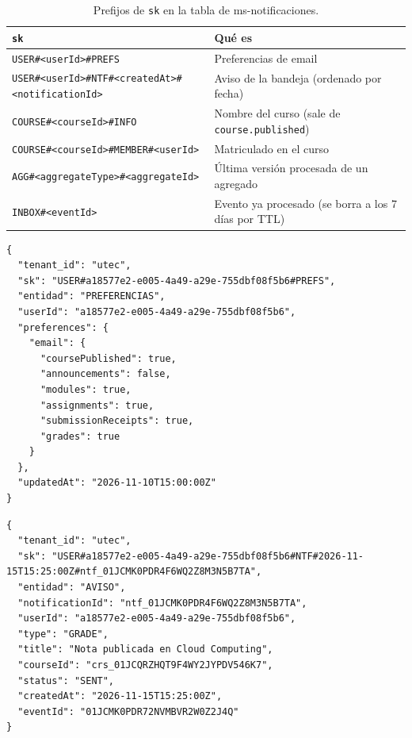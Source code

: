 \begin{table}[htbp]
\centering\small
\begin{tabularx}{\textwidth}{>{\raggedright\arraybackslash}p{}X}
\toprule
\texttt{sk} & Qué es \\
\midrule
\texttt{USER\#\allowbreak{}<userId>\#\allowbreak{}PREFS} & Preferencias de email \\
\texttt{USER\#\allowbreak{}<userId>\#\allowbreak{}NTF\#\allowbreak{}<createdAt>\#\allowbreak{}<notificationId>} & Aviso de la bandeja (ordenado por fecha) \\
\texttt{COURSE\#\allowbreak{}<courseId>\#\allowbreak{}INFO} & Nombre del curso (sale de \texttt{course.published}) \\
\texttt{COURSE\#\allowbreak{}<courseId>\#\allowbreak{}MEMBER\#\allowbreak{}<userId>} & Matriculado en el curso \\
\texttt{AGG\#\allowbreak{}<aggregateType>\#\allowbreak{}<aggregateId>} & Última versión procesada de un agregado \\
\texttt{INBOX\#\allowbreak{}<eventId>} & Evento ya procesado (se borra a los 7 días por TTL) \\
\bottomrule
\end{tabularx}
\caption{Prefijos de \texttt{sk} en la tabla de ms-notificaciones.}
\end{table}

\begin{lstlisting}
{
  "tenant_id": "utec",
  "sk": "USER#a18577e2-e005-4a49-a29e-755dbf08f5b6#PREFS",
  "entidad": "PREFERENCIAS",
  "userId": "a18577e2-e005-4a49-a29e-755dbf08f5b6",
  "preferences": {
    "email": {
      "coursePublished": true,
      "announcements": false,
      "modules": true,
      "assignments": true,
      "submissionReceipts": true,
      "grades": true
    }
  },
  "updatedAt": "2026-11-10T15:00:00Z"
}
\end{lstlisting}

\begin{lstlisting}
{
  "tenant_id": "utec",
  "sk": "USER#a18577e2-e005-4a49-a29e-755dbf08f5b6#NTF#2026-11-15T15:25:00Z#ntf_01JCMK0PDR4F6WQ2Z8M3N5B7TA",
  "entidad": "AVISO",
  "notificationId": "ntf_01JCMK0PDR4F6WQ2Z8M3N5B7TA",
  "userId": "a18577e2-e005-4a49-a29e-755dbf08f5b6",
  "type": "GRADE",
  "title": "Nota publicada en Cloud Computing",
  "courseId": "crs_01JCQRZHQT9F4WY2JYPDV546K7",
  "status": "SENT",
  "createdAt": "2026-11-15T15:25:00Z",
  "eventId": "01JCMK0PDR72NVMBVR2W0Z2J4Q"
}
\end{lstlisting}

